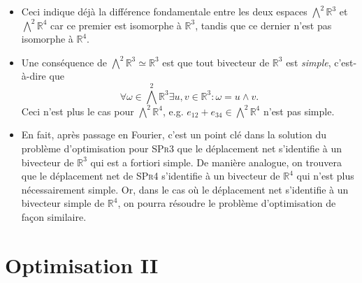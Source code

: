 \documentclass[12pt,a4paper]{article}
\theoremstyle{plain}
\theoremstyle{plain}
\theoremstyle{plain}
\newtheorem{lemma}[theorem]{Lemma}
\theoremstyle{definition}
\theoremstyle{definition}
\theoremstyle{definition}
\theoremstyle{plain}
\newcommand{\R}{\mathbb{R}}
\begin{document}
\begin{itemize}
\item Ceci indique déjà la différence fondamentale entre les deux espaces $\bigwedge^2 \R^3$ et $\bigwedge^2  \R^4$ car ce premier est isomorphe à $\R^3$, tandis que ce dernier n'est pas isomorphe à $\R^4$.

\item Une conséquence de $\bigwedge^2  \R^3 \simeq \R^3$ est que tout bivecteur de $\R^3$ est \emph{simple}, c'est-à-dire que
\begin{equation}
\forall \omega \in \bigwedge^2 \R^3 \exists u,v \in \R^3: \omega = u \wedge v.
\end{equation}
Ceci n'est plus le cas pour $\bigwedge^2\R^4$, e.g. $e_{12} + e_{34} \in \bigwedge^2\R^4$ n'est pas simple. 

\item En fait, après passage en Fourier, c'est un point clé dans la solution du problème d'optimisation pour \textsc{SPr3} que le déplacement net s'identifie à un bivecteur de $\R^3$ qui est a fortiori simple. De manière analogue, on trouvera que le déplacement net de \textsc{SPr4} s'identifie à un bivecteur de $\R^4$ qui n'est plus nécessairement simple. Or, dans le cas où le déplacement net s'identifie à un bivecteur simple de $\R^4$, on pourra résoudre le problème d'optimisation de façon similaire.

\end{itemize}

\section{Optimisation II}
\end{document}
